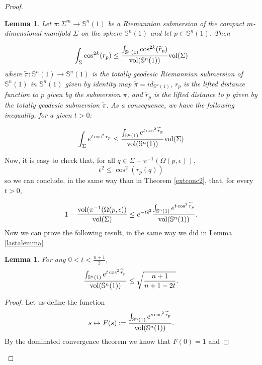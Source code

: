 \documentclass{amsart}
\newtheorem{lemma}[theorem]{Lemma}
\theoremstyle{definition}
\theoremstyle{remark}
\newcommand{\ese}{\mathbb{S}}
\begin{document}
\begin{proof}
\begin{lemma}\label{keylemasub}
Let  $\pi: \Sigma^m \to \mathbb{S}^n(1)$ be a Riemannian submersion of the compact $m$-dimensional manifold $\Sigma$ on the sphere  $\mathbb{S}^n(1)$ and let $p\in \mathbb{S}^n(1)$. Then

\begin{equation}\label{lemmaformula1bis}
\int_\Sigma \cos^{2k}(r_p) \leq \frac{\int_{\mathbb{S}^n(1)} \cos^{2k}(\widetilde{r}_p)}{{\rm vol}(\mathbb{S}^n(1))} {\rm vol}(\Sigma)
\end{equation}
where  $\widetilde{\pi}: \mathbb{S}^n(1) \rightarrow \mathbb{S}^n(1)$ is the totally geodesic Riemannian submersion of $\ese^n(1)$ in $\ese^n(1)$ given by identity map $\widetilde{\pi}=id_{\ese^n(1)}$, $r_p$ is the lifted distance function to $p$ given by the submersion $\pi$, and $\widetilde{r}_p$ is the lifted distance to $p$ given by the totally geodesic submersion $\widetilde{\pi}$. As a consequence, we have the following inequality,  for a given $t>0$:

\begin{equation}\label{lemmaformula2bis}
\int_{\Sigma} e^{t \cos^2r_p}  \leq\frac{\int_{\ese^n(1)} e^{t \cos^2\widetilde{r}_p}}{{\rm vol}(\mathbb{S}^n(1))} {\rm vol}(\Sigma)
\end{equation}
\end{lemma}

Now, it is easy to check that, for all  $q \in\Sigma-\pi^{-1}(\Omega(p,\epsilon))$, 
$$ \bar\epsilon^2 \leq \cos^2(r_p(q))$$
\noindent so we can conclude, in the same way than in Theorem \ref{extconc2}, that, for every $t >0$,

\begin{equation}\label{preskauxlastabis}
    1-\frac{{\rm vol}(\pi^{-1}(\Omega(p,\epsilon))}{{\rm vol}(\Sigma)}\leq e^{-t\bar\epsilon^2}\frac{\int_{\mathbb{S}^n(1)}e^{t \cos^2\widetilde{r}_p}}{{\rm vol}(\mathbb{S}^n(1))}.
\end{equation}
Now we can prove the following result, in the same way we did in Lemma \ref{lastalemma}
\begin{lemma}\label{lastalemmabis} For any $0<t<\frac{n+1}{2}$,
$$
  \frac{\int_{\mathbb{S}^n(1)}e^{t \cos^2\widetilde{r}_p}}{{\rm vol}(\mathbb{S}^n(1))}\leq \sqrt{\frac{n+1}{n+1-2t}}.
    $$
\end{lemma}
\begin{proof}
    Let us define the function 
    $$
s\mapsto F(s):= \frac{\int_{\mathbb{S}^n(1)}e^{s \cos^2\widetilde{r}_p}}{{\rm vol}(\mathbb{S}^n(1))}.
    $$
  By the dominated convergence theorem we know that $F(0)=1$ and
     

\end{proof}
\end{proof}
\end{document}
